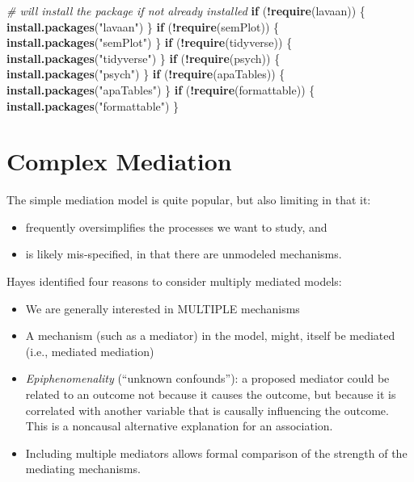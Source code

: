 \documentclass[
  11pt,
]{book}
\newenvironment{Shaded}{\begin{snugshade}}{\end{snugshade}}
\newcommand{\CommentTok}[1]{\textcolor[rgb]{0.37,0.37,0.37}{\textit{#1}}}
\newcommand{\ControlFlowTok}[1]{\textcolor[rgb]{0.27,0.27,0.27}{\textbf{#1}}}
\newcommand{\FunctionTok}[1]{\textcolor[rgb]{0.27,0.27,0.27}{\textbf{#1}}}
\newcommand{\NormalTok}[1]{#1}
\newcommand{\SpecialCharTok}[1]{\textcolor[rgb]{0.43,0.43,0.43}{\textbf{#1}}}
\newcommand{\StringTok}[1]{\textcolor[rgb]{0.5,0.5,0.5}{#1}}
\providecommand{\tightlist}{%
  \setlength{\itemsep}{0pt}\setlength{\parskip}{0pt}}
\begin{document}
\begin{Shaded}
\begin{Highlighting}[]
\CommentTok{\# will install the package if not already installed}
\ControlFlowTok{if}\NormalTok{ (}\SpecialCharTok{!}\FunctionTok{require}\NormalTok{(lavaan)) \{}
    \FunctionTok{install.packages}\NormalTok{(}\StringTok{"lavaan"}\NormalTok{)}
\NormalTok{\}}
\ControlFlowTok{if}\NormalTok{ (}\SpecialCharTok{!}\FunctionTok{require}\NormalTok{(semPlot)) \{}
    \FunctionTok{install.packages}\NormalTok{(}\StringTok{"semPlot"}\NormalTok{)}
\NormalTok{\}}
\ControlFlowTok{if}\NormalTok{ (}\SpecialCharTok{!}\FunctionTok{require}\NormalTok{(tidyverse)) \{}
    \FunctionTok{install.packages}\NormalTok{(}\StringTok{"tidyverse"}\NormalTok{)}
\NormalTok{\}}
\ControlFlowTok{if}\NormalTok{ (}\SpecialCharTok{!}\FunctionTok{require}\NormalTok{(psych)) \{}
    \FunctionTok{install.packages}\NormalTok{(}\StringTok{"psych"}\NormalTok{)}
\NormalTok{\}}
\ControlFlowTok{if}\NormalTok{ (}\SpecialCharTok{!}\FunctionTok{require}\NormalTok{(apaTables)) \{}
    \FunctionTok{install.packages}\NormalTok{(}\StringTok{"apaTables"}\NormalTok{)}
\NormalTok{\}}
\ControlFlowTok{if}\NormalTok{ (}\SpecialCharTok{!}\FunctionTok{require}\NormalTok{(formattable)) \{}
    \FunctionTok{install.packages}\NormalTok{(}\StringTok{"formattable"}\NormalTok{)}
\NormalTok{\}}
\end{Highlighting}
\end{Shaded}

\hypertarget{complex-mediation}{%
\section{Complex Mediation}\label{complex-mediation}}

The simple mediation model is quite popular, but also limiting in that it:

\begin{itemize}
\tightlist
\item
  frequently oversimplifies the processes we want to study, and
\item
  is likely mis-specified, in that there are unmodeled mechanisms.
\end{itemize}

Hayes \citeyearpar{hayes_introduction_2018} identified four reasons to consider multiply mediated models:

\begin{itemize}
\tightlist
\item
  We are generally interested in MULTIPLE mechanisms
\item
  A mechanism (such as a mediator) in the model, might, itself be mediated (i.e., mediated mediation)
\item
  \emph{Epiphenomenality} (``unknown confounds''): a proposed mediator could be related to an outcome not because it causes the outcome, but because it is correlated with another variable that is causally influencing the outcome. This is a noncausal alternative explanation for an association.
\item
  Including multiple mediators allows formal comparison of the strength of the mediating mechanisms.
\end{itemize}
\end{document}
